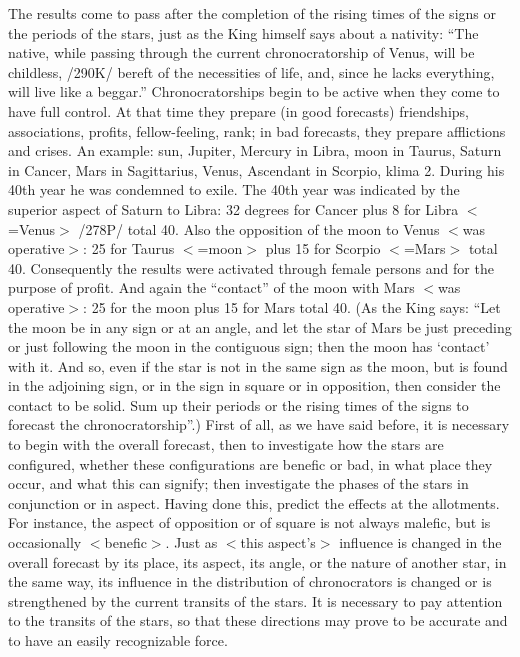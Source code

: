 The results come to pass after the completion of the rising times of the signs or the periods of the stars,
just as the King himself says about a nativity: “The native, while passing through the current
chronocratorship of Venus, will be childless, /290K/ bereft of the necessities of life, and, since he lacks
everything, will live like a beggar.” Chronocratorships begin to be active when they come to have full
control. At that time they prepare (in good forecasts) friendships, associations, profits, fellow-feeling, rank;
in bad forecasts, they prepare afflictions and crises.
An example: sun, Jupiter, Mercury in Libra, moon in Taurus, Saturn in Cancer, Mars in Sagittarius,
Venus, Ascendant in Scorpio, klima 2. During his 40th year he was condemned to exile. The 40th year
was indicated by the superior aspect of Saturn to Libra: 32 degrees for Cancer plus 8 for Libra $<$=Venus$>$
/278P/ total 40. Also the opposition of the moon to Venus $<$was operative$>$: 25 for Taurus $<$=moon$>$
plus 15 for Scorpio $<$=Mars$>$ total 40. Consequently the results were activated through female persons and
for the purpose of profit. And again the “contact” of the moon with Mars $<$was operative$>$: 25 for the
moon plus 15 for Mars total 40.
(As the King says: “Let the moon be in any sign or at an angle, and let the star of Mars be just
preceding or just following the moon in the contiguous sign; then the moon has ‘contact’ with it. And so,
even if the star is not in the same sign as the moon, but is found in the adjoining sign, or in the sign in
square or in opposition, then consider the contact to be solid. Sum up their periods or the rising times of
the signs to forecast the chronocratorship”.)
First of all, as we have said before, it is necessary to begin with the overall forecast, then to investigate
how the stars are configured, whether these configurations are benefic or bad, in what place they occur, and
what this can signify; then investigate the phases of the stars in conjunction or in aspect. Having done
this, predict the effects at the allotments. For instance, the aspect of opposition or of square is not always
malefic, but is occasionally $<$benefic$>$. Just as $<$this aspect’s$>$ influence is changed in the overall forecast
by its place, its aspect, its angle, or the nature of another star, in the same way, its influence in the
distribution of chronocrators is changed or is strengthened by the current transits of the stars. It is
necessary to pay attention to the transits of the stars, so that these directions may prove to be accurate and
to have an easily recognizable force.
